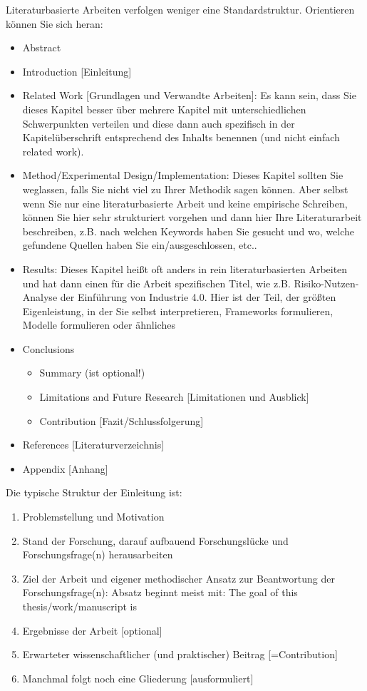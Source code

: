 Literaturbasierte Arbeiten verfolgen weniger eine Standardstruktur. Orientieren können Sie sich heran:
\begin{itemize}
  \item	Abstract
  \item Introduction [Einleitung]
  \item Related Work [Grundlagen und Verwandte Arbeiten]: Es kann sein, dass Sie dieses Kapitel besser über mehrere Kapitel mit unterschiedlichen Schwerpunkten verteilen und diese dann auch spezifisch in der Kapitelüberschrift entsprechend des Inhalts benennen (und nicht einfach related work).
  \item Method/Experimental Design/Implementation: Dieses Kapitel sollten Sie weglassen, falls Sie nicht viel zu Ihrer Methodik sagen können. Aber selbst wenn Sie nur eine literaturbasierte Arbeit und keine empirische Schreiben, können Sie hier sehr strukturiert vorgehen und dann hier Ihre Literaturarbeit beschreiben, z.B. nach welchen Keywords haben Sie gesucht und wo, welche gefundene Quellen haben Sie ein/ausgeschlossen, etc..
  \item Results: Dieses Kapitel heißt oft anders in rein literaturbasierten Arbeiten und hat dann einen für die Arbeit spezifischen Titel, wie z.B. Risiko-Nutzen-Analyse der Einführung von Industrie 4.0. Hier ist der Teil, der größten Eigenleistung, in der Sie selbst interpretieren, Frameworks formulieren, Modelle formulieren oder ähnliches
       \item Conclusions
  \begin{itemize}
    \item Summary (ist optional!)
    \item Limitations and Future Research [Limitationen und Ausblick]
     \item Contribution [Fazit/Schlussfolgerung]
   \end{itemize}
  \item References [Literaturverzeichnis]
  \item Appendix [Anhang]
\end{itemize}

Die typische Struktur der Einleitung ist:
\begin{enumerate}
  \item Problemstellung und Motivation
  \item Stand der Forschung, darauf aufbauend Forschungslücke und Forschungsfrage(n) herausarbeiten
  \item Ziel der Arbeit und eigener methodischer Ansatz zur Beantwortung der Forschungsfrage(n): Absatz beginnt meist mit: The goal of this thesis/work/manuscript is
  \item Ergebnisse der Arbeit [optional]
  \item Erwarteter wissenschaftlicher (und praktischer) Beitrag [=Contribution]
  \item Manchmal folgt noch eine Gliederung [ausformuliert]
\end{enumerate}
